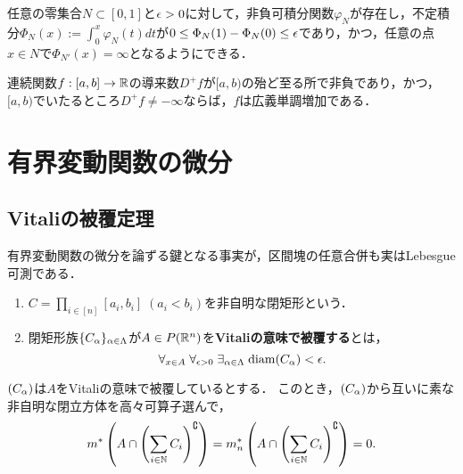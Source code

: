 \documentclass[uplatex, dvipdfmx]{jsreport}
\begin{document}
\begin{theorem}
    任意の零集合$N\subset[0,1]$と$\epsilon>0$に対して，非負可積分関数$\varphi_N$が存在し，不定積分$\Phi_N(x):=\int^x_0\varphi_N(t)dt$が$0\le\Phi_N(1)-\Phi_N(0)\le\epsilon$であり，かつ，任意の点$x\in N$で$\Phi_{N'}(x)=\infty$となるようにできる．
\end{theorem}

\begin{corollary}[一般化されたDiniの定理]
    連続関数$f:[a,b]\to\mathbb{R}$の導来数$D^+f$が$[a,b)$の殆ど至る所で非負であり，かつ，
    $[a,b)$でいたるところ$D^+f\ne-\infty$ならば，$f$は広義単調増加である．
\end{corollary}

\section{有界変動関数の微分}

\subsection{Vitaliの被覆定理}

\begin{tcolorbox}[colframe=ForestGreen, colback=ForestGreen!10!white,breakable,colbacktitle=ForestGreen!40!white,coltitle=black,fonttitle=\bfseries\sffamily,
title=]
    有界変動関数の微分を論ずる鍵となる事実が，区間塊の任意合併も実はLebesgue可測である．
\end{tcolorbox}

\begin{definition}\mbox{}
    \begin{enumerate}
        \item $C=\prod_{i\in[n]}[a_i,b_i]\;(a_i<b_i)$を非自明な閉矩形という．
        \item 閉矩形族$\{C_\alpha\}_{\alpha\in\Lambda}$が$A\in P(\mathbb{R}^n)$を\textbf{Vitaliの意味で被覆する}とは，
        \[\forall_{x\in A}\;\forall_{\epsilon>0}\;\exists_{\alpha\in\Lambda}\;\mathrm{diam}(C_\alpha)<\epsilon.\]
    \end{enumerate}
\end{definition}



\begin{theorem}[Vitali (1907)]
    $(C_\alpha)$は$A$をVitaliの意味で被覆しているとする．
    このとき，$(C_\alpha)$から互いに素な非自明な閉立方体を高々可算子選んで，
    \[m^*\left(A\cap\left(\sum_{i\in\mathbb{N}}C_i\right)^\complement\right)=m_n^*\left(A\cap\left(\sum_{i\in\mathbb{N}}C_i\right)^\complement\right)=0.\]
\end{theorem}
\end{document}
